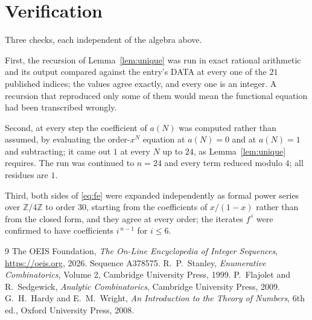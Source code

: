 \documentclass[11pt,a4paper]{article}
\theoremstyle{plain}
\theoremstyle{definition}
\begin{document}
\section{Verification}

Three checks, each independent of the algebra above.

First, the recursion of Lemma~\ref{lem:unique} was run in exact rational arithmetic and
its output compared against the entry's DATA at every one of the $21$ published
indices; the values agree exactly, and every one is an integer. A recursion that reproduced
only some of them would mean the functional equation had been transcribed wrongly.

Second, at every step the coefficient of $a(N)$ was computed rather than assumed, by
evaluating the order-$x^{N}$ equation at $a(N)=0$ and at $a(N)=1$ and subtracting; it came
out $1$ at every $N$ up to $24$, as Lemma~\ref{lem:unique} requires. The run was continued
to $n=24$ and every term reduced modulo $4$; all residues are $1$.

Third, both sides of \eqref{eq:fe} were expanded independently as formal power series over
$\mathbb{Z}/4\mathbb{Z}$ to order $30$, starting from the coefficients of $x/(1-x)$
rather than from the closed form, and they agree at every order; the iterates $f^{\,i}$
were confirmed to have coefficients $i^{\,n-1}$ for $i\le6$.

\begin{thebibliography}{9}
 The OEIS Foundation, \emph{The On-Line Encyclopedia of Integer
Sequences}, \url{https://oeis.org}, 2026. Sequence A378575.
 R.~P.~Stanley, \emph{Enumerative Combinatorics}, Volume 2, Cambridge
University Press, 1999.
 P.~Flajolet and R.~Sedgewick, \emph{Analytic Combinatorics}, Cambridge
University Press, 2009.
 G.~H.~Hardy and E.~M.~Wright, \emph{An Introduction to the Theory of
Numbers}, 6th ed., Oxford University Press, 2008.
\end{thebibliography}
\end{document}
